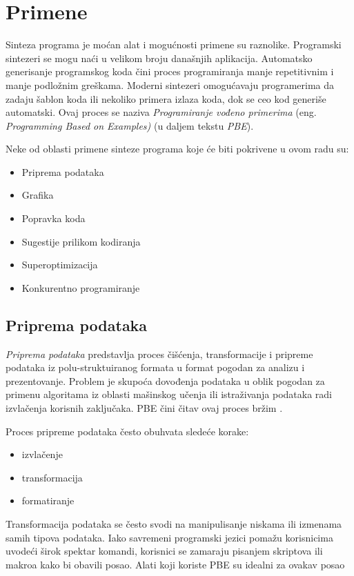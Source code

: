 \section{Primene}
\label{sec:Primene}

Sinteza programa je moćan alat i mogućnosti primene su raznolike. Programski sintezeri se mogu naći u velikom broju današnjih aplikacija. Automatsko generisanje programskog koda čini proces programiranja manje repetitivnim i manje podložnim greškama. Moderni sintezeri omo\-gu\-ća\-va\-ju programerima da zadaju šablon koda ili nekoliko primera izlaza koda, dok se ceo kod generiše automatski. Ovaj proces se naziva \emph{Programiranje vođeno primerima} (eng. \emph{Programming Based on Examples)} \cite{ProgrammingBasedOnExamples} (u daljem tekstu \emph{PBE}).

Neke od oblasti primene sinteze programa koje će biti pokrivene u ovom radu su:
\begin{itemize}
    \item Priprema podataka
    \item Grafika
    \item Popravka koda
    \item Sugestije prilikom kodiranja
    \item Superoptimizacija
    \item Konkurentno programiranje
\end{itemize}


\subsection{Priprema podataka}
\label{subsec:PripremaPodataka}

\emph{Priprema podataka} predstavlja proces čišćenja, transformacije i pripreme podataka iz polu-struktuiranog formata u format pogodan za analizu i prezentovanje. Problem je skupoća dovođenja podataka u oblik pogodan za primenu algoritama iz oblasti mašinskog učenja ili istraživanja podataka radi izvlačenja korisnih zaključaka. PBE čini čitav ovaj proces bržim \cite{ProgrammingBasedOnExamples}.

Proces pripreme podataka često obuhvata sledeće korake:
\begin{itemize}
  \item izvlačenje
  \item transformacija
  \item formatiranje
\end{itemize}

Transformacija podataka se često svodi na manipulisanje niskama ili izmenama samih tipova podataka. Iako savremeni programski jezici pomažu korisnicima uvodeći širok spektar komandi, korisnici se zamaraju pisanjem skriptova ili makroa kako bi obavili posao. Alati koji koriste PBE su idealni za ovakav posao \cite{ProgrammingBasedOnExamples, SynthesizingNumberTransformationsFromIOExamples}


